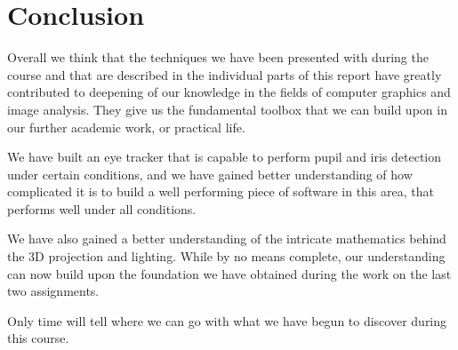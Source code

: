 \clearpage

\section{Conclusion}

Overall we think that the techniques we have been presented with during the course and that are described in the individual parts of this report have greatly contributed to deepening of our knowledge in the fields of computer graphics and image analysis. They give us the fundamental toolbox that we can build upon in our further academic work, or practical life. 

We have built an eye tracker that is capable to perform pupil and iris detection under certain conditions, and we have gained better understanding of how complicated it is to build a well performing piece of software in this area, that performs well under all conditions.

We have also gained a better understanding of the intricate mathematics behind the 3D projection and lighting. While by no means complete, our understanding can now build upon the foundation we have obtained during the work on the last two assignments.

Only time will tell where we can go with what we have begun to discover during this course.
